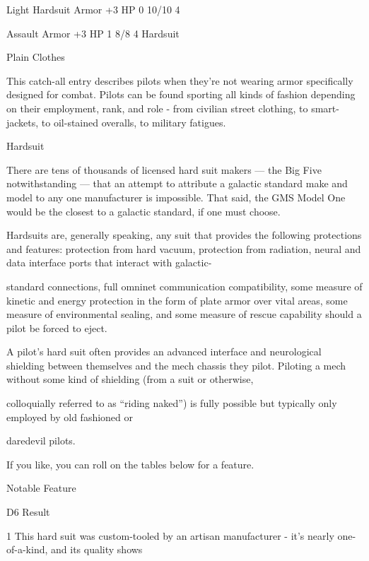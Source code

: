    Light Hardsuit      Armor               +3 HP                                0            10/10            4

    Assault             Armor               +3 HP                                1            8/8              4
    Hardsuit

                                                     Plain Clothes

This catch-all entry describes pilots when they're not wearing armor specifically designed for
combat. Pilots can be found sporting all kinds of fashion depending on their employment, rank,
and role - from civilian street clothing, to smart-jackets, to oil-stained overalls, to military
fatigues.





                                                         Hardsuit

There are tens of thousands of licensed hard suit makers — the Big Five notwithstanding — that an attempt
to attribute a galactic standard make and model to any one manufacturer is impossible. That said, the GMS
Model One would be the closest to a galactic standard, if one must choose.

Hardsuits are, generally speaking, any suit that provides the following protections and features: protection
from hard vacuum, protection from radiation, neural and data interface ports that interact with galactic-

standard connections, full omninet communication compatibility, some measure of kinetic and energy
protection in the form of plate armor over vital areas, some measure of environmental sealing, and some
measure of rescue capability should a pilot be forced to eject.

A pilot's hard suit often provides an advanced interface and neurological shielding between themselves and
the mech chassis they pilot. Piloting a mech without some kind of shielding (from a suit or otherwise,

colloquially referred to as ``riding naked'') is fully possible but typically only employed by old fashioned or

daredevil pilots.

If you like, you can roll on the tables below for a feature.


                                                       Notable Feature


  D6     Result

  1      This hard suit was custom-tooled by an artisan manufacturer - it's nearly one-of-a-kind, and its quality shows

